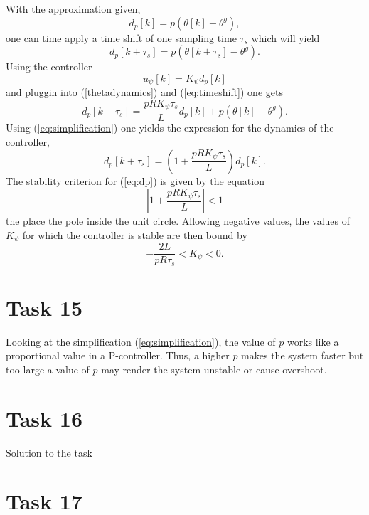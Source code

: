 \documentclass[a4paper,12pt,oneside,onecolumn]{article} %
\begin{document}
With the approximation given,
\begin{equation}
\label{eq:simplification}
d_p[k] = p(\theta[k] - \theta^g),
\end{equation}
one can time apply a time shift of one sampling time $\tau_s$ which will yield
\begin{equation}
\label{eq:timeshift}
d_p[k + \tau_s] = p(\theta[k + \tau_s] - \theta^g).
\end{equation}
Using the controller 
\begin{equation}
u_\psi[k] = K_\psi d_p[k]
\end{equation}
and pluggin into (\ref{thetadynamics}) and (\ref{eq:timeshift}) one gets
\begin{equation}
d_p[k + \tau_s] = \frac{p R K_\psi \tau_s}{L} d_p[k] + p(\theta[k] - \theta^g).
\end{equation}
Using (\ref{eq:simplification}) one yields the expression for the dynamics of the controller,
\begin{equation}
\label{eq:dp}
d_p[k+\tau_s] = \left ( 1 + \frac{p R K_\psi \tau_s}{L} \right ) d_p[k].
\end{equation}
The stability criterion for (\ref{eq:dp}) is given by the equation
\begin{equation}
\left | 1 + \frac{p R K_\psi \tau_s}{L} \right | < 1
\end{equation}
the place the pole inside the unit circle.
Allowing negative values, the values of $K_\psi$ for which the controller is stable are then bound by
\begin{equation}
-\frac{2L}{p R \tau_s} < K_\psi < 0.
\end{equation}
\section*{Task 15}
Looking at the simplification (\ref{eq:simplification}), the value of $p$ works like a proportional value in a P-controller. Thus, a higher $p$ makes the system faster but too large a value of $p$ may render the system unstable or cause overshoot.

\section*{Task 16}

Solution to the task

\section*{Task 17}
\end{document}
